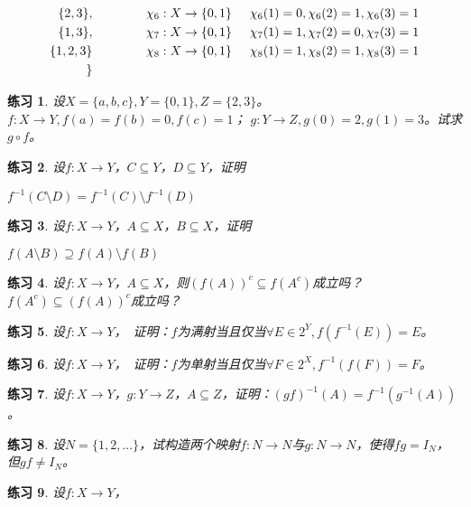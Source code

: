 \documentclass{book}[oneside]
\newtheorem{Exercise}{练习}[chapter]
\begin{document}
\begin{CJK*}{UTF8}{gbsn}
\begin{align*}
    \{2,3\},&\hspace{1.5cm}\chi_6:X\to \{0,1\}\hspace{0.5cm} \chi_6(1)=0,\chi_6(2)=1,\chi_6(3)=1\\
    \{1,3\},&\hspace{1.5cm}\chi_7:X\to \{0,1\}\hspace{0.5cm} \chi_7(1)=1,\chi_7(2)=0,\chi_7(3)=1\\
    \{1,2,3\}&\hspace{1.5cm}\chi_8:X\to \{0,1\}\hspace{0.5cm} \chi_8(1)=1,\chi_8(2)=1,\chi_8(3)=1\\
    \}\\
  \end{align*}

  

    \begin{Exercise}
  设$X=\{a,b,c\}, Y=\{0,1\}, Z=\{2,3\}$。$f:X \to Y, f(a) = f(b) = 0, f(c) = 1$；
  $g:Y\to Z, g(0) = 2, g(1) = 3$。试求$g\circ f$。
  \end{Exercise}
  \begin{Exercise}
    设$f:X \to Y$，$C \subseteq Y$，$D \subseteq Y$，证明

    $f^{-1}(C \setminus D) = f^{-1}(C) \setminus f^{-1}(D)$
  \end{Exercise}
    \begin{Exercise}
    设$f:X \to Y$，$A \subseteq X$，$B \subseteq X$，证明

    $f(A \setminus B) \supseteq f(A) \setminus f(B)$
    
  \end{Exercise}
  \begin{Exercise}
    设$f:X\to Y$，$A \subseteq X$，则$(f(A))^c \subseteq f(A^c)$成立吗？$ f(A^c)\subseteq (f(A))^c$成立吗？
  \end{Exercise}
  \begin{Exercise}
    设$f:X\to Y$，　证明：$f$为满射当且仅当$\forall E \in 2^Y, f(f^{-1}(E)) = E$。
  \end{Exercise}

  \begin{Exercise}
    设$f:X\to Y$，　证明：$f$为单射当且仅当$\forall F \in 2^X, f^{-1}(f(F)) = F$。    
  \end{Exercise}
    \begin{Exercise}
    设$f:X \to Y$，$g:Y \to Z$，$A \subseteq Z$，证明：$(gf)^{-1}(A) = f^{-1}(g^{-1}(A))$。
  \end{Exercise}
  \begin{Exercise}
    设$N=\{1,2,\ldots\}$，试构造两个映射$f:N \to N$与$g:N\to N$，使得$fg = I_N$，
    但$gf \neq I_N$。
  \end{Exercise}
 \begin{Exercise}
    设$f:X \to Y$，


\end{Exercise}
\end{CJK*}
\end{document}
